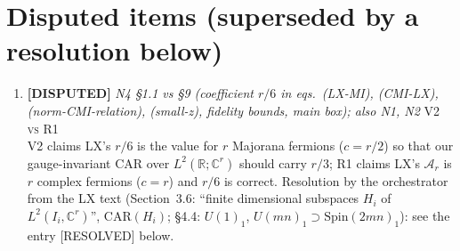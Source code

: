 \documentclass[11pt]{article}
\begin{document}
\section{Disputed items (superseded by a resolution below)}
\begin{enumerate}[leftmargin=1.6em,itemsep=6pt]
\item \textbf{[DISPUTED]} \emph{N4 \S1.1 vs \S9 (coefficient \(r/6\) in eqs.\ (LX-MI), (CMI-LX), (norm-CMI-relation), (small-z), fidelity bounds, main box); also N1, N2} \hfill\textsc{V2 vs R1}\\ V2 claims LX's \(r/6\) is the value for \(r\) Majorana fermions (\(c=r/2\)) so that our gauge-invariant CAR over \(L^2(\mathbb R;\mathbb C^r)\) should carry \(r/3\); R1 claims LX's \(\mathcal A_r\) is \(r\) complex fermions (\(c=r\)) and \(r/6\) is correct. Resolution by the orchestrator from the LX text (Section~3.6: ``finite dimensional subspaces \(H_i\) of \(L^2(I_i,\mathbb C^r)\)'', \(\mathrm{CAR}(H_i)\); \S4.4: \(U(1)_1\), \(U(mn)_1\supset\mathrm{Spin}(2mn)_1\)): see the entry [RESOLVED] below.
\end{enumerate}
\end{document}
